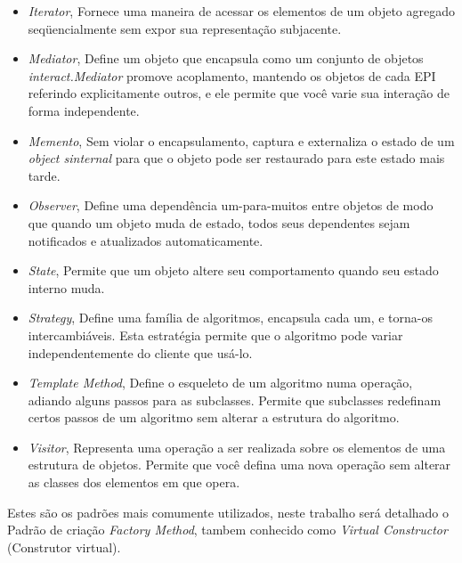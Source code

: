\begin{itemize}
\begin{itemize}
			\item \emph{Iterator}, Fornece uma maneira de acessar os elementos de um objeto agregado seqüencialmente sem expor sua representação subjacente.\\

			\item \emph{Mediator}, Define um objeto que encapsula como um conjunto de objetos \emph{interact.Mediator} promove acoplamento, mantendo os objetos de cada EPI referindo explicitamente outros, e ele permite que você varie sua interação de forma independente.\\


			\item \emph{Memento}, Sem violar o encapsulamento, captura e externaliza o estado de um \emph{object sinternal} para que o objeto pode ser restaurado para este estado mais tarde. \\

			\item \emph{Observer}, Define uma dependência um-para-muitos entre objetos de modo que quando um objeto muda de estado, todos seus dependentes sejam notificados e atualizados automaticamente.\\

			\item \emph{State}, Permite que um objeto altere seu comportamento quando seu estado interno muda.\\
			
			\item \emph{Strategy}, Define uma família de algoritmos, encapsula cada um, e torna-os intercambiáveis.
Esta estratégia permite que o algoritmo pode variar independentemente do cliente que usá-lo.\\


			\item \emph{Template Method}, Define o esqueleto de um algoritmo numa operação, adiando alguns passos para as subclasses. Permite que subclasses redefinam certos passos de um algoritmo sem alterar a estrutura do algoritmo.\\

			\item \emph{Visitor}, Representa uma operação a ser realizada sobre os elementos de uma estrutura de objetos. Permite que você defina uma nova operação sem alterar as classes dos elementos em que opera.\\



		\end{itemize}

\end{itemize}

Estes são os padrões mais comumente utilizados, neste trabalho será detalhado o Padrão de criação \emph{Factory Method}, tambem conhecido como \emph{Virtual Constructor} (Construtor virtual).
